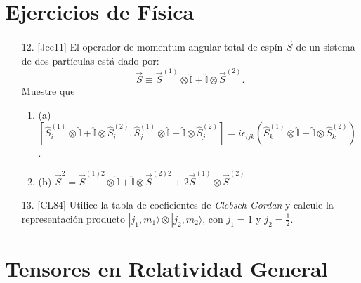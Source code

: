 \documentclass[a4paper,12pt]{article}
\begin{document}
\section*{Ejercicios de Física}

\begin{enumerate}
    \item [12.] [Jee11] El operador de momentum angular total de espín $\vec{S}$ de un sistema de dos partículas está dado por:
    $$
    \vec{S} \equiv \vec{S}^{(1)} \otimes \hat{\mathbb{I}} + \hat{\mathbb{I}} \otimes \vec{S}^{(2)}.
    $$
    Muestre que
    \begin{enumerate}
        \item (a) $\left[ \hat{S}_i^{(1)} \otimes \hat{\mathbb{I}} + \hat{\mathbb{I}} \otimes \hat{S}_i^{(2)}, \hat{S}_j^{(1)} \otimes \hat{\mathbb{I}} + \hat{\mathbb{I}} \otimes \hat{S}_j^{(2)} \right] = i \epsilon_{ijk} (\hat{S}_k^{(1)} \otimes \hat{\mathbb{I}} + \hat{\mathbb{I}} \otimes \hat{S}_k^{(2)})$.
        \item (b) $\vec{S}^2 = \vec{S}^{(1)2} \otimes \hat{\mathbb{I}} + \hat{\mathbb{I}} \otimes \vec{S}^{(2)2} + 2 \vec{S}^{(1)} \otimes \vec{S}^{(2)}$.
    \end{enumerate}

    \item [13.] [CL84] Utilice la tabla de coeficientes de \textit{Clebsch-Gordan} y calcule la representación producto $|j_1, m_1\rangle \otimes |j_2, m_2\rangle$, con $j_1 = 1$ y $j_2 = \frac{1}{2}$.
\end{enumerate}

\section*{Tensores en Relatividad General}
\end{document}
